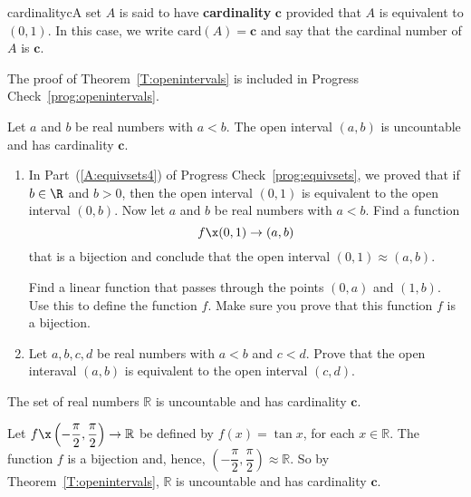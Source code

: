 \begin{defbox}{cardinalityc}{A set $A$ is said to have \textbf{cardinality}
%
%
  $\boldsymbol{c}$ provided that $A$ is equivalent to $( 0, 1 )$.  In this case, we write 
$\text{card} ( A ) = \boldsymbol{c}$ and say that the cardinal number of $A$ is 
$\boldsymbol{c}$.}
\end{defbox}

\noindent
The proof of Theorem~\ref{T:openintervals} is included in Progress Check~\ref{prog:openintervals}.

\begin{theorem}\label{T:openintervals}
Let $a$ and $b$ be real numbers with $a < b$.  The open interval $( a, b )$ is uncountable and has cardinality $\boldsymbol{c}$.
\end{theorem}
%
\begin{prog}\label{prog:openintervals} \hfill
\begin{enumerate}
\item In Part~(\ref{A:equivsets4}) of Progress Check~\ref{prog:equivsets}, we proved that if 
$b \in \R$ and $b > 0$, then the open interval $( 0, 1 )$ is equivalent to the open interval $( 0, b )$.  Now let $a$ and $b$ be real numbers with $a < b$.  Find a function 
\[
f\x  ( 0, 1 ) \to ( a, b )
\]
that is a bijection and conclude that the open interval $( 0, 1) \approx ( a, b )$.

\hint Find a linear function that passes through the points $( 0, a )$ and 
$( 1, b )$.  Use this to define the function $f$.  Make sure you prove that this function $f$ is a bijection.

\item Let $a, b, c, d$ be real numbers with $a < b$ and $c < d$.  Prove that the open interaval $( a, b )$ is equivalent to the open interval $( c, d )$.
\end{enumerate}
\end{prog}
\hbreak
%
\begin{theorem}\label{T:realsuncount}
The set of real numbers $\mathbb{R}$ is uncountable and has cardinality $\boldsymbol{c}$.
\end{theorem}
%
\begin{myproof}
Let $f\x  \left( -\dfrac{\pi}{2}, \dfrac{\pi}{2} \right) \to \mathbb{R}$ be defined by 
$f ( x ) = \tan x$, for each $x \in \mathbb{R}$.  The function $f$ is a bijection and, hence, 
$\left(-\dfrac{\pi}{2}, \dfrac{\pi}{2} \right) \approx \mathbb{R}$.  So by 
Theorem~\ref{T:openintervals}, $\mathbb{R}$ is uncountable and has cardinality $\boldsymbol{c}$.
\end{myproof}

\endinput
